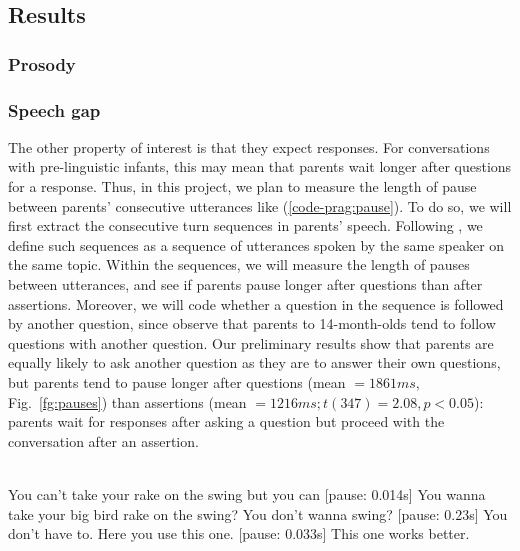 \subsection{Results}
\label{sec:engsp:results}



\subsubsection{Prosody}
\label{sec:engsp:results:prosody}

\subsubsection{Speech gap}
\label{sec:engsp:results:pause}

The other property of interest is that they expect responses. For conversations with pre-linguistic infants, this may mean that parents wait longer after questions for a response. Thus, in this project, we plan to measure the length of pause between parents’ consecutive utterances like (\ref{code-prag:pause}). To do so, we will first extract the consecutive turn sequences in parents’ speech. Following \cite{reimchen2017}, we define such sequences as a sequence of utterances spoken by the same speaker on the same topic. Within the sequences, we will measure the length of pauses between utterances, and see if parents pause longer after questions than after assertions. Moreover, we will code whether a question in the sequence is followed by another question, since \cite{reimchen2017} observe that parents to 14-month-olds tend to follow questions with another question. Our preliminary results show that parents are equally likely to ask another question as they are to answer their own questions, but parents tend to pause longer after questions (mean $= 1861ms$, Fig.~\ref{fg:pauses}) than assertions (mean $= 1216ms; t(347) = 2.08, p <0.05$): parents wait for responses after asking a question but proceed with the conversation after an assertion. 




\\ 
\bxl
\ex You can’t take your rake on the swing but you can [pause: 0.014s] You wanna take your big bird rake on the swing? 			\hfill {}
\ex You don't wanna swing? [pause: 0.23s]	You don’t have to.	\hfill {}
\ex Here you use this one. [pause: 0.033s] This one works better.	\hfill {}
\exl
\eex



